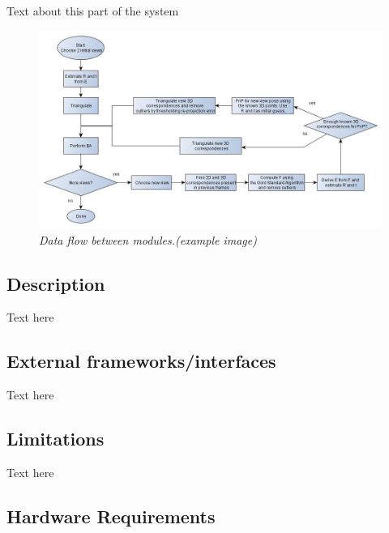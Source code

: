 Text about this part of the system



\begin{figure}[htb]
	\centering
	\includegraphics[width=160mm]{images/example1.jpg}
	\caption[This text ends up at the list of figures]{\textit{Data flow between modules.(example image)}}
	\label{fig:block_overview_fig}  %
\end{figure}



\subsection{Description}
Text here

\subsection{External frameworks/interfaces}
Text here

\subsection{Limitations}
Text here

\subsection{Hardware Requirements}
\label{sec:hardware_req}
\reqtable
{
}